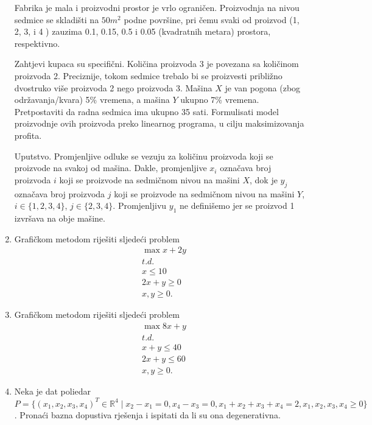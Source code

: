\documentclass[a4paper, utf8, 11pt, colorlinks]{book}
\theoremstyle{definition}
\begin{document}
\begin{enumerate}
Fabrika je  mala i proizvodni prostor je vrlo ograničen. Proizvodnja na nivou sedmice se skladišti na $50 m^2$ podne površine, pri čemu svaki od proizvod (1, 2, 3, i 4 ) zauzima 0.1, 0.15, 0.5 i 0.05 (kvadratnih metara) prostora,  respektivno. 

Zahtjevi kupaca su specifični. Količina proizvoda 3 je povezana sa količinom  proizvoda 2. Preciznije, tokom sedmice trebalo bi se proizvesti približno dvostruko više  proizvoda 2 nego proizvoda 3. Mašina $X$ je van pogona (zbog održavanja/kvara) 5\% vremena, a mašina $Y$ ukupno 7\% vremena.
Pretpostaviti da radna sedmica ima ukupno 35 sati. Formulisati model proizvodnje ovih proizvoda preko linearnog programa, u cilju maksimizovanja profita. 

Uputstvo. Promjenljive odluke se vezuju za količinu proizvoda koji se proizvode na svakoj od mašina.  Dakle, 
promjenljive $x_i$ označava broj proizvoda $i$ koji se proizvode na sedmičnom nivou na mašini $X$, dok je $y_j$ označava  broj proizvoda $j$ koji se proizvode na sedmičnom nivou na mašini $Y$, $i \in \{1,2,3,4\}$, $j \in \{2,3,4\}$. Promjenljivu $y_1$ ne definišemo jer se proizvod 1 izvršava na obje mašine.  

	\item Grafičkom metodom riješiti sljedeći problem
	\begin{align*}
		&\max   x + 2 y \\
		& t.d. \\
		& x \leq 10 \\
		& 2 x + y\geq 0 \\
		& x,y \geq 0.
	\end{align*}
	\item Grafičkom metodom riješiti sljedeći problem 
	\begin{align*}
		& \max  8 x + y \\
		& t.d. \\
		&  x + y \leq 40 \\
		& 2x + y \leq 60 \\
		& x,y \geq 0.
	\end{align*}

\item Neka je dat poliedar $P= \{ (x_1,x_2,x_3, x_4)^T \in \mathbb{R}^4 \mid x_2 - x_1 = 0, x_4 - x_3 = 0,  x_1 + x_2 +   x_3 + x_4 = 2, x_1,x_2,x_3, x_4 \geq 0 \}$.  Pronaći bazna dopustiva rješenja i ispitati da li su ona degenerativna.  
\end{enumerate}
\end{document}
